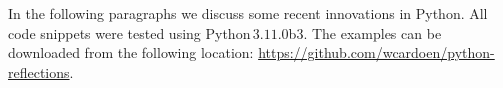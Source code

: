 \documentclass[10pt]{article}
\begin{document}
\title{}
\author{Wim R.M. Cardoen \\ Email: \$(prefix)[at]gmail[dot]com \\ where \\ prefix='wcardoen' }
\date{\today}
\maketitle
\thispagestyle{empty}
\pagestyle{plain}
\setcounter{page}{1}
\renewcommand \thesection{\Roman{section}} 

In the following paragraphs we discuss some recent innovations in Python. 
All code snippets were tested using Python\,$3.11.0$b$3$.
The examples can be downloaded from the following location:\newline
\href{https://github.com/wcardoen/python-reflections.git}{https://github.com/wcardoen/python-reflections}.
\end{document}
